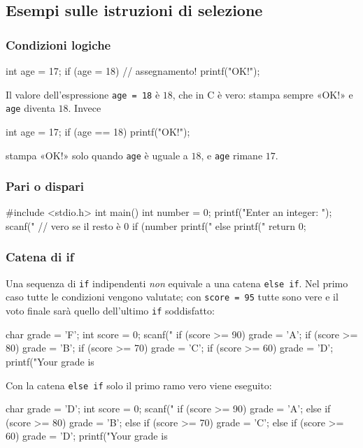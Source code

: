 \documentclass[11pt,a4paper]{article}
\begin{document}
\subsection{Esempi sulle istruzioni di selezione}

\subsubsection{Condizioni logiche}

\begin{codice}
int age = 17;
if (age = 18)           // assegnamento!
    printf("OK!");
\end{codice}
Il valore dell'espressione \lstinline|age = 18| è $18$, che in C è vero: stampa sempre «OK!» e \lstinline|age| diventa $18$. Invece
\begin{codice}
int age = 17;
if (age == 18)
    printf("OK!");
\end{codice}
stampa «OK!» solo quando \lstinline|age| è uguale a $18$, e \lstinline|age| rimane $17$.

\subsubsection{Pari o dispari}

\begin{codice}
#include <stdio.h>
int main() {
    int number = 0;
    printf("Enter an integer: ");
    scanf("%
    // vero se il resto è 0
    if (number %
        printf("%
    else
        printf("%
    return 0;
}
\end{codice}

\subsubsection{Catena di if}

Una sequenza di \lstinline|if| indipendenti \emph{non} equivale a una catena \lstinline|else if|. Nel primo caso tutte le condizioni vengono valutate; con \lstinline|score = 95| tutte sono vere e il voto finale sarà quello dell'ultimo \lstinline|if| soddisfatto:
\begin{codice}
char grade = 'F';
int score = 0;
scanf("%
if (score >= 90) grade = 'A';
if (score >= 80) grade = 'B';
if (score >= 70) grade = 'C';
if (score >= 60) grade = 'D';
printf("Your grade is %
\end{codice}
Con la catena \lstinline|else if| solo il primo ramo vero viene eseguito:
\begin{codice}
char grade = 'D';
int score = 0;
scanf("%
if (score >= 90)
    grade = 'A';
else if (score >= 80)
    grade = 'B';
else if (score >= 70)
    grade = 'C';
else if (score >= 60)
    grade = 'D';
printf("Your grade is %
\end{codice}
\end{document}
